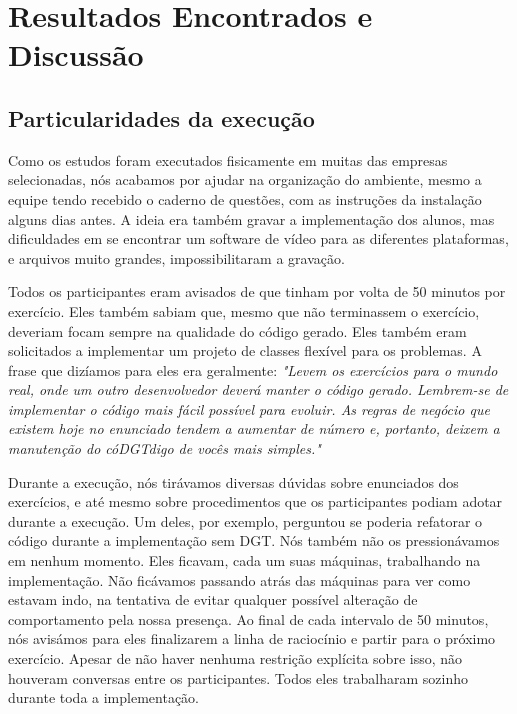 \chapter{Resultados Encontrados e Discussão}
\label{cap:discussao}

\section{Particularidades da execução}

Como os estudos foram executados fisicamente em muitas das empresas selecionadas,
nós acabamos por ajudar na organização do ambiente, mesmo a equipe tendo 
recebido o caderno de questões, com as instruções da instalação
alguns dias antes. A ideia era também gravar a implementação dos alunos,
mas dificuldades em se encontrar um software de vídeo para as diferentes
plataformas, e arquivos muito grandes, impossibilitaram a gravação.

Todos os participantes eram avisados de que tinham por volta de 50 minutos
por exercício. Eles também sabiam que, mesmo que não terminassem o exercício,
deveriam focam sempre na qualidade do código gerado. Eles também eram solicitados
a implementar um projeto de classes flexível para os problemas. A frase que dizíamos para
eles era geralmente: \textit{"Levem os exercícios para o mundo real, onde um outro
desenvolvedor deverá manter o código gerado. Lembrem-se de implementar o código mais fácil possível
para evoluir. As regras de negócio que existem hoje no enunciado tendem a aumentar
de número e, portanto, deixem a manutenção do cóDGTdigo de vocês mais simples."}

Durante a execução, nós tirávamos diversas dúvidas sobre enunciados dos
exercícios, e até mesmo sobre procedimentos que os participantes podiam
adotar durante a execução. Um deles, por exemplo, perguntou se poderia
refatorar o código durante a implementação sem DGT. 
Nós também não os pressionávamos em nenhum momento. Eles ficavam,
cada um suas máquinas, trabalhando na implementação. Não ficávamos 
passando atrás das máquinas para ver como estavam indo, na tentativa
de evitar qualquer possível alteração de comportamento pela nossa presença.
Ao final de cada intervalo de 50 minutos, nós avisámos para eles finalizarem
a linha de raciocínio e partir para o próximo exercício.
Apesar de não haver nenhuma restrição explícita sobre isso, não houveram
conversas entre os participantes. Todos eles trabalharam sozinho
durante toda a implementação.

